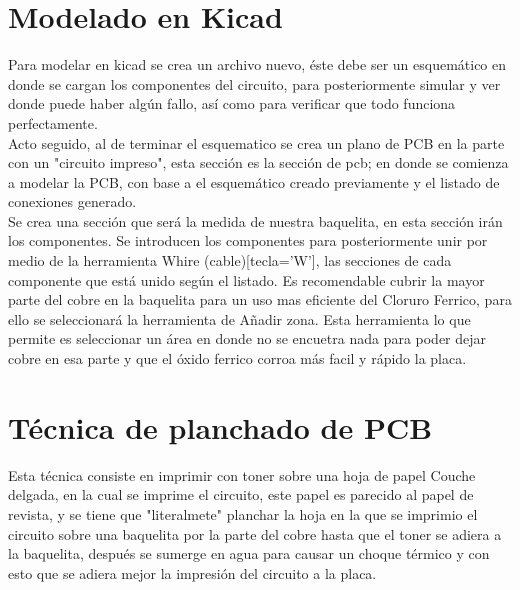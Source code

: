 \documentclass[letterpaper]{article}
\begin{document}
\section{Modelado en Kicad}
\begin{large}
    Para modelar en kicad se crea un archivo nuevo, éste debe ser un esquemático en donde se cargan los componentes del circuito, para posteriormente simular y ver donde puede haber algún fallo, así como para verificar que todo funciona perfectamente.  \\
    Acto seguido, al de terminar el esquematico se crea un plano de PCB en la parte con un "circuito impreso", esta sección es la sección de pcb; en donde se comienza a modelar la PCB, con base a el esquemático creado previamente y el listado de conexiones generado.\\
    Se crea una sección que será la medida de nuestra baquelita, en esta sección irán los componentes. Se introducen los componentes para posteriormente unir por medio de la herramienta Whire (cable)[tecla='W'], las secciones de cada componente que está unido según el listado. Es recomendable cubrir la mayor parte del cobre en la baquelita para un uso mas eficiente del Cloruro Ferrico, para ello se seleccionará la herramienta de Añadir zona. Esta herramienta lo que permite es seleccionar un área en donde no se encuetra nada para poder dejar cobre en esa parte y que el óxido ferrico corroa más facil y rápido la placa.
\end{large}
\section{Técnica de planchado de PCB}
\begin{large}
    Esta técnica consiste en imprimir con toner sobre una hoja de papel Couche delgada, en la cual se imprime el circuito, este papel es parecido al papel de revista, y se tiene que "literalmete" planchar la hoja en la que se imprimio el circuito sobre una baquelita por la parte del cobre  hasta que el toner se adiera a la baquelita, después se sumerge en agua para causar un choque térmico y con esto que se adiera mejor la impresión del circuito a la placa.
\end{large}
\newpage
\end{document}
